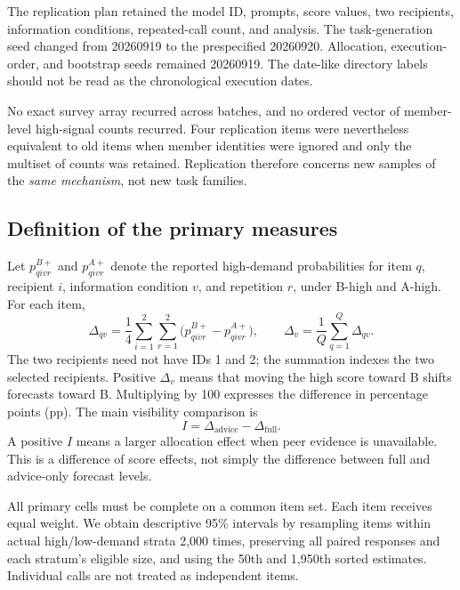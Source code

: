\documentclass[11pt]{article}
\begin{document}
The replication plan retained the model ID, prompts, score values, two recipients, information conditions, repeated-call count, and analysis. The task-generation seed changed from 20260919 to the prespecified 20260920. Allocation, execution-order, and bootstrap seeds remained 20260919. The date-like directory labels should not be read as the chronological execution dates.

No exact survey array recurred across batches, and no ordered vector of member-level high-signal counts recurred. Four replication items were nevertheless equivalent to old items when member identities were ignored and only the multiset of counts was retained. Replication therefore concerns new samples of the \emph{same mechanism}, not new task families.

\subsection{Definition of the primary measures}
Let $p_{qivr}^{B+}$ and $p_{qivr}^{A+}$ denote the reported high-demand probabilities for item $q$, recipient $i$, information condition $v$, and repetition $r$, under B-high and A-high. For each item,
\begin{equation}
\Delta_{qv}=\frac14\sum_{i=1}^{2}\sum_{r=1}^{2}
\bigl(p_{qivr}^{B+}-p_{qivr}^{A+}\bigr),\qquad
\Delta_v=\frac1Q\sum_{q=1}^{Q}\Delta_{qv}.
\end{equation}
The two recipients need not have IDs 1 and 2; the summation indexes the two selected recipients. Positive $\Delta_v$ means that moving the high score toward B shifts forecasts toward B. Multiplying by 100 expresses the difference in percentage points (pp). The main visibility comparison is
\begin{equation}
I=\Delta_{\mathrm{advice}}-\Delta_{\mathrm{full}}.
\end{equation}
A positive $I$ means a larger allocation effect when peer evidence is unavailable. This is a difference of score effects, not simply the difference between full and advice-only forecast levels.

All primary cells must be complete on a common item set. Each item receives equal weight. We obtain descriptive 95\% intervals by resampling items within actual high/low-demand strata 2,000 times, preserving all paired responses and each stratum's eligible size, and using the 50th and 1,950th sorted estimates. Individual calls are not treated as independent items.
\end{document}
